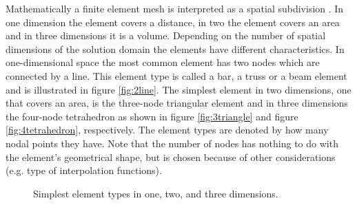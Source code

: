 Mathematically a finite element mesh is interpreted as a spatial
subdivision .
%
In one dimension the element covers a distance, in two the element
covers an area and in three dimensions it is a volume.
%
Depending on the number of spatial dimensions of the solution domain
the elements have different characteristics. In one-dimensional space
the most common element has two nodes which are connected by a
line. This element type is called a bar, a truss or a beam
element and is illustrated in figure \vref{fig:2line}.
%
The simplest element in two dimensions, one that covers an area, is
the three-node triangular element and in three dimensions the four-node
tetrahedron as shown in figure \ref{fig:3triangle} and figure
\vref{fig:4tetrahedron}, respectively.
%
The element types are denoted by how many nodal points they have.
Note that the number of nodes has nothing to do with the element's
geometrical shape, but is chosen because of other considerations (e.g.
type of interpolation functions).

\begin{figure}
  \centering
  \hspace{10mm}
  \hspace{10mm}
  \caption{Simplest element types in one, two, and three dimensions.}
  \label{fig:simple-elements}
\end{figure}

